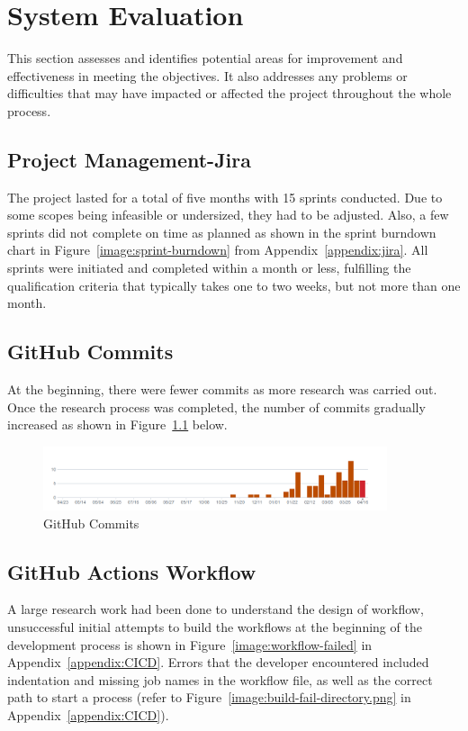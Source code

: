 \chapter{System Evaluation}

This section assesses and identifies potential areas for improvement and effectiveness in meeting the objectives. It also addresses any problems or difficulties that may have impacted or affected the project throughout the whole process.

\section{Project Management-Jira}
The project lasted for a total of five months with 15 sprints conducted. Due to some scopes being infeasible or undersized, they had to be adjusted. Also, a few sprints did not complete on time as planned as shown in the sprint burndown chart in Figure~\ref{image:sprint-burndown} from Appendix~\ref{appendix:jira}. All sprints were initiated and completed within a month or less, fulfilling the qualification criteria that typically takes one to two weeks, but not more than one month.

\section{GitHub Commits}
At the beginning, there were fewer commits as more research was carried out. Once the research process was completed, the number of commits gradually increased as shown in Figure~\ref{image:commits} below.

\begin{figure}[h!]
    \centering
    \includegraphics[width=0.9\textwidth]{images/commits.png}
    \caption{GitHub Commits}
    \label{image:commits}
\end{figure}

\section{GitHub Actions Workflow}
A large research work had been done to understand the design of workflow, unsuccessful initial attempts to build the workflows at the beginning of the development process is shown in Figure~\ref{image:workflow-failed} in Appendix~\ref{appendix:CICD}. Errors that the developer encountered included indentation and missing job names in the workflow file, as well as the correct path to start a process (refer to Figure~\ref{image:build-fail-directory.png} in Appendix~\ref{appendix:CICD}). 

